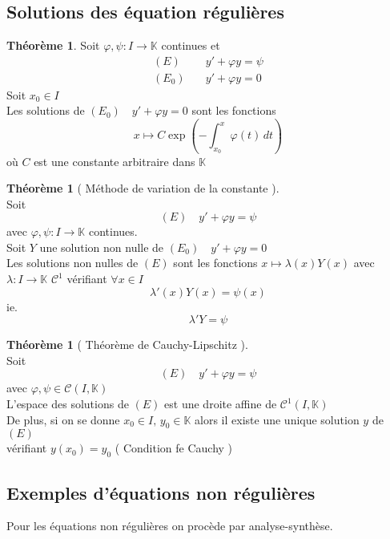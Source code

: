 \documentclass[10pt,a4paper]{article}
\theoremstyle{definition}
\newtheorem{theorem}[proposition]{Théorème}
\begin{document}
\subsection{Solutions des équation régulières}
\begin{theorem}
    Soit \(\varphi, \psi : I \to \mathbb{K}\) continues et
    \begin{align*}
        (E)& \quad y' + \varphi y = \psi \\
        (E_0)& \quad y' + \varphi y = 0
    \end{align*}
    Soit \(x_0 \in I\) \\
    Les solutions de \((E_0) \quad y' + \varphi y = 0\) sont les fonctions
    \[\boxed{x \mapsto C\exp\left(-\int_{x_0}^{x} \varphi(t) \,dt \right)}\]
    où \(C\) est une constante arbitraire dans \(\mathbb{K}\)
\end{theorem}
\begin{theorem}[ Méthode de variation de la constante ]
    \hfill \\
    Soit \[(E) \quad y' + \varphi y = \psi\]
    avec \(\varphi, \psi: I \to \mathbb{K}\) continues. \\
    Soit \(Y\) une solution non nulle de \((E_0) \quad y' + \varphi y = 0\) \\
    Les solutions non nulles de \((E)\) sont les fonctions \(x \mapsto \lambda(x) Y(x)\) avec \(\lambda: I \to \mathbb{K}\) \(\mathcal{C}^1\) vérifiant \(\forall x \in I\)
    \[\boxed{\lambda'(x) Y(x) = \psi(x)}\]
    ie.
    \[\boxed{\lambda' Y = \psi}\]
\end{theorem}
\begin{theorem}[ Théorème de Cauchy-Lipschitz ]
    \hfill \\
    Soit \[(E) \quad y' + \varphi y = \psi\]
    avec \(\varphi, \psi \in \mathcal{C}(I, \mathbb{K})\) \\
    L'espace des solutions de \((E)\) est une droite affine de \(\mathcal{C}^1(I, \mathbb{K})\) \\
    De plus, si on se donne \(x_0 \in I,\, y_0 \in \mathbb{K}\) alors il existe une unique solution \(y\) de \((E)\) \\
    vérifiant \(y(x_0) = y_0\) ( Condition fe Cauchy )
\end{theorem}

\subsection{Exemples d'équations non régulières}
\noindent Pour les équations non régulières on procède par analyse-synthèse. \medskip
\end{document}
